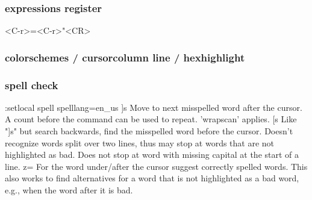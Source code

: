 \documentclass{beamer}
\begin{document}
\begin{frame}
  \frametitle{expressions register}
  <C-r>=<C-r>"<CR>
\end{frame}

\begin{frame}
  \frametitle{colorschemes / cursorcolumn line / hexhighlight}
\end{frame}

\begin{frame}
  \frametitle{spell check}
      :setlocal spell spelllang=en\_us
    ]s			Move to next misspelled word after the cursor.
    A count before the command can be used to repeat.
    'wrapscan' applies.
    [s			Like "]s" but search backwards, find the misspelled
    word before the cursor.  Doesn't recognize words
    split over two lines, thus may stop at words that are
    not highlighted as bad.  Does not stop at word with
    missing capital at the start of a line.
    z=			For the word under/after the cursor suggest correctly
    spelled words.  This also works to find alternatives
    for a word that is not highlighted as a bad word,
    e.g., when the word after it is bad.
\end{frame}
\end{document}

